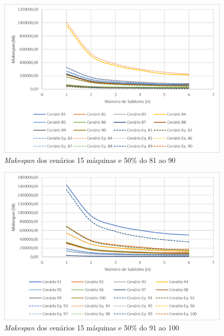 \begin{figure}[H]
    \centering
     \includegraphics[width=13cm]{Apendices/Figuras/15m50_81-90.png}
     \caption{\textit{Makespan} dos cenários 15 máquinas e 50\% do 81 ao 90}
    \label{fig:15m50_81-90}
\end{figure}

\begin{figure}[H]
    \centering
     \includegraphics[width=13cm]{Apendices/Figuras/15m50_91-100.png}
     \caption{\textit{Makespan} dos cenários 15 máquinas e 50\% do 91 ao 100}
    \label{fig:15m50_91-100}
\end{figure}